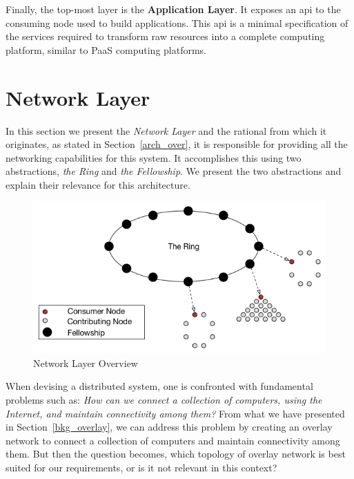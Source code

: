 \documentclass[12pt, titlepage]{uo_temp}
\begin{document}
     Finally, the top-most layer is the \textbf{Application Layer}. It exposes an
     \gls{api} to the consuming node used to build applications. This \gls{api} is a
     minimal specification of the services required to transform raw resources into a
     complete computing platform, similar to PaaS computing platforms.

     \section{Network Layer}
     In this section we present the \emph{Network Layer} and the rational from which it
     originates, as stated in Section~\ref{arch_over}, it is responsible for providing all
     the networking capabilities for this system. It accomplishes this using two
     abstractions, \emph{the Ring} and \emph{the Fellowship}. We present the two
     abstractions and explain their relevance for this architecture.

     \begin{figure}
       \centering
       \includegraphics[width=125mm]{images/arch_net_ring_fellow.png}
       \caption{Network Layer Overview}
     \end{figure}

     When devising a distributed system, one is confronted with fundamental problems such
     as: \emph{How can we connect a collection of computers, using the Internet, and
       maintain connectivity among them?} From what we have presented in
     Section~\ref{bkg_overlay}, we can address this problem by creating an overlay network
     to connect a collection of computers and maintain connectivity among them. But then
     the question becomes, which topology of overlay network is best suited for our
     requirements, or is it not relevant in this context?
\end{document}
